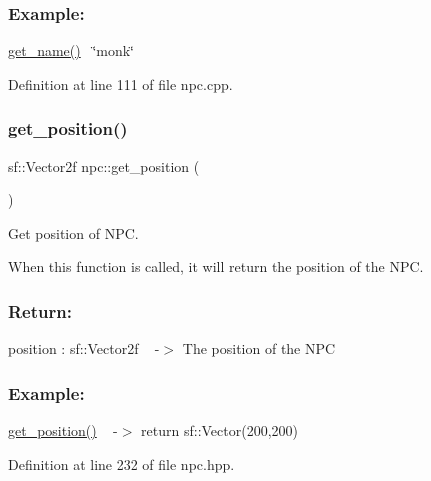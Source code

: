 \subsubsection*{Example\+: }

\hyperlink{classnpc_a670b40abcf52e0615883622324ac3bc9}{get\+\_\+name()}~\newline
\char`\"{}monk\char`\"{}~\newline


Definition at line 111 of file npc.\+cpp.

\mbox{\label{classnpc_af58658444d25eaa77aec883dd9d5592d}} 
\subsubsection{\texorpdfstring{get\+\_\+position()}{get\_position()}}
{\footnotesize\ttfamily sf\+::\+Vector2f npc\+::get\+\_\+position (\begin{DoxyParamCaption}{ }\end{DoxyParamCaption})\hspace{0.3cm}{\ttfamily [inline]}}



Get position of N\+PC. 

When this function is called, it will return the position of the N\+PC.

\subsubsection*{Return\+: }

position \+: sf\+::\+Vector2f ~\newline
-\/$>$ The position of the N\+PC

\subsubsection*{Example\+: }

\hyperlink{classnpc_af58658444d25eaa77aec883dd9d5592d}{get\+\_\+position()} ~\newline
-\/$>$ return sf\+::\+Vector(200,200) 

Definition at line 232 of file npc.\+hpp.

